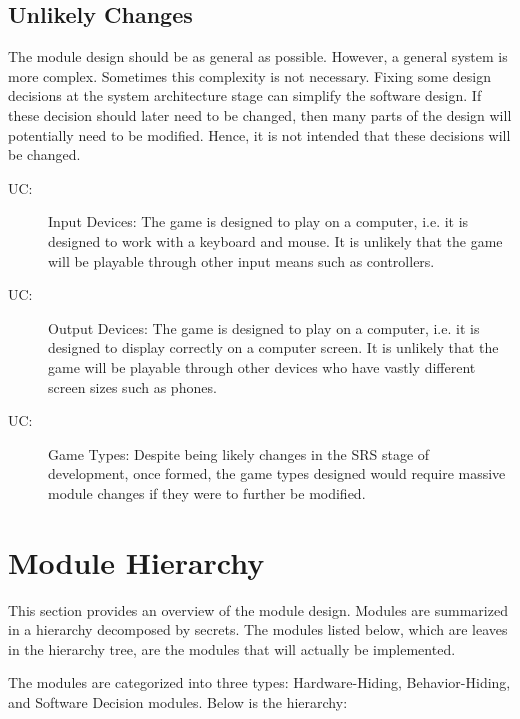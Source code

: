 \documentclass[12pt, titlepage]{article}
\newcounter{ucnum}
\newcommand{\uctheucnum}{UC\theucnum}
\begin{document}

\subsection{Unlikely Changes} \label{SecUchange}

The module design should be as general as possible. However, a general system is
more complex. Sometimes this complexity is not necessary. Fixing some design
decisions at the system architecture stage can simplify the software design. If
these decision should later need to be changed, then many parts of the design
will potentially need to be modified. Hence, it is not intended that these
decisions will be changed.

\begin{description}
\item[ \uctheucnum \label{ucInput}:] Input Devices: The game is designed to play on a computer, i.e. it is designed to work with a keyboard and mouse. It is unlikely that the game will be playable through other input means such as controllers.
\item[ \uctheucnum \label{ucOutput}:] Output Devices: The game is designed to play on a computer, i.e. it is designed to display correctly on a computer screen. It is unlikely that the game will be playable through other devices who have vastly different screen sizes such as phones.
\item[ \uctheucnum \label{ucGames}:] Game Types: Despite being likely changes in the SRS stage of development, once formed, the game types designed would require massive module changes if they were to further be modified.
\end{description}

\newpage
\section{Module Hierarchy} \label{SecMH}

This section provides an overview of the module design. Modules are summarized
in a hierarchy decomposed by secrets. The modules listed
below, which are leaves in the hierarchy tree, are the modules that will
actually be implemented.

The modules are categorized into three types: Hardware-Hiding, Behavior-Hiding, and Software Decision modules. Below is the hierarchy:
\end{document}
